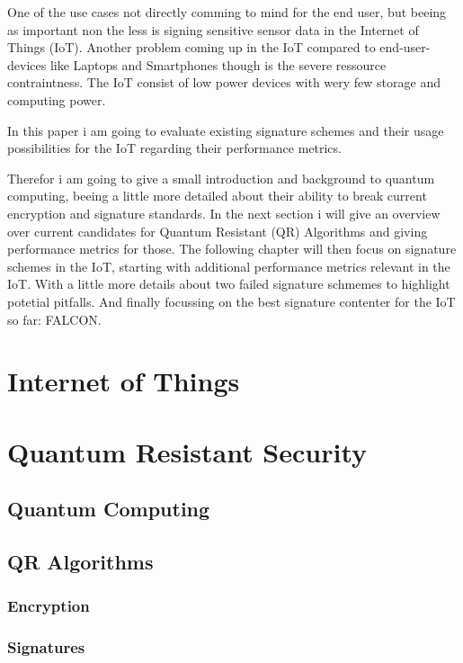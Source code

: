 \documentclass[conference]{IEEEtran}
\begin{document}
One of the use cases not directly comming to mind for the end user, but beeing as important non the less is signing sensitive sensor data in the Internet of Things (IoT).
Another problem coming up in the IoT compared to end-user-devices like Laptops and Smartphones though is the severe ressource contraintness. 
The IoT consist of low power devices with wery few storage and computing power.

In this paper i am going to evaluate existing signature schemes and their usage possibilities for the IoT regarding their performance metrics.

Therefor i am going to give a small introduction and background to quantum computing, beeing a little more detailed about their ability to break current encryption and signature standards.
In the next section i will give an overview over current candidates for Quantum Resistant (QR) Algorithms and giving performance metrics for those.
The following chapter will then focus on signature schemes in the IoT, starting with additional performance metrics relevant in the IoT.
With a little more details about two failed signature schmemes to highlight potetial pitfalls. 
And finally focussing on the best signature contenter for the IoT so far: FALCON.



\section{Internet of Things}

\section{Quantum Resistant Security}
\subsection{Quantum Computing}\label{quantum computing}
\subsection{QR Algorithms}
\subsubsection{Encryption}
\subsubsection{Signatures} 
\end{document}
